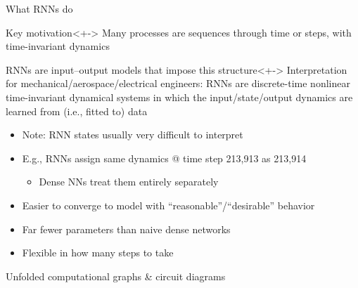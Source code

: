 \begin{frame}{What RNNs do}
    \begin{block}{Key motivation}<+->
        Many processes are sequences through \alert{time} or \alert{steps}, with \alert{time-invariant dynamics}
    \end{block}

    \begin{block}{RNNs are input--output models that impose this structure}<+->
        Interpretation for mechanical/aerospace/electrical engineers: RNNs are \alert{discrete-time nonlinear time-invariant dynamical systems} in which the input/state/output dynamics are learned from (i.e., fitted to) data
    \end{block}

    \begin{itemize}
        \item Note: RNN states usually very difficult to interpret
        \item E.g., RNNs assign same dynamics @ time step 213,913 as 213,914
        \begin{itemize}
            \item Dense NNs treat them entirely separately
        \end{itemize}
        \item Easier to converge to model with ``reasonable''/``desirable'' behavior
        \item Far fewer parameters than naive dense networks
        \item Flexible in how many steps to take
    \end{itemize}
\end{frame}

\begin{frame}{Unfolded computational graphs \& circuit diagrams}
    
\end{frame}

